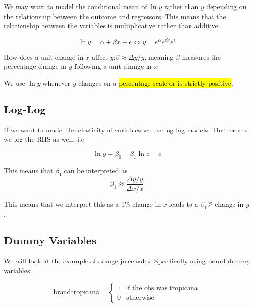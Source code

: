 \documentclass[11pt]{article}
\begin{document}
We may want to model the conditional mean of $\ln y$ rather than $y$ depending on the relationship between the outcome and regressors. This means that the relationship between the variables is multiplicative rather than additive.

\begin{equation*}
    \ln y = \alpha + \beta x + \epsilon \Leftrightarrow y = e^\alpha e^{\beta x}e^\epsilon
\end{equation*}

How does a unit change in $x$ affect $y$:$\beta \approx \Delta y /y$, meaning $\beta$ measures the percentage change in $y$ following a unit change in $x$

\begin{note}
    We use $\ln y$ whenever $y$ changes on a \hl{percentage scale or is strictly positive}. 
\end{note}

\subsection{Log-Log}
If we want to model the elasticity of variables we use log-log-models. That means we log the RHS as well. i.e.

\begin{equation*}
    \ln y = \beta_0 + \beta_1 \ln x + \epsilon
\end{equation*}

This means that $\beta_1$ can be interpreted as 
\begin{equation*}
    \beta_1 \approx \dfrac{\Delta y / y}{\Delta x/ x}
\end{equation*}

This means that we interpret this as a 1\% change in $x$ leads to a $\beta_1 \%$ change in $y$.

\subsection{Dummy Variables}

We will look at the example of orange juice sales. Specifically using brand dummy variables:

\begin{equation*}
\text{brandtropicana} = \begin{cases}
        1 & \text{if the obs was tropicana} \\
        0 & \text{otherwise}
    \end{cases}
\end{equation*}
\end{document}
